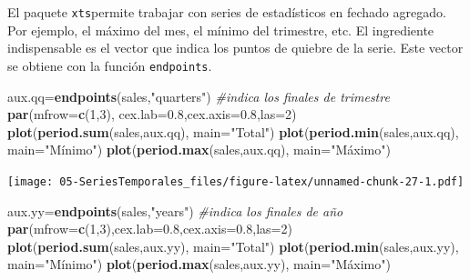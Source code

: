 \documentclass[]{book}
\newenvironment{Shaded}{\begin{snugshade}}{\end{snugshade}}
\newcommand{\CommentTok}[1]{\textcolor[rgb]{0.56,0.35,0.01}{\textit{#1}}}
\newcommand{\DataTypeTok}[1]{\textcolor[rgb]{0.13,0.29,0.53}{#1}}
\newcommand{\DecValTok}[1]{\textcolor[rgb]{0.00,0.00,0.81}{#1}}
\newcommand{\FloatTok}[1]{\textcolor[rgb]{0.00,0.00,0.81}{#1}}
\newcommand{\KeywordTok}[1]{\textcolor[rgb]{0.13,0.29,0.53}{\textbf{#1}}}
\newcommand{\NormalTok}[1]{#1}
\newcommand{\StringTok}[1]{\textcolor[rgb]{0.31,0.60,0.02}{#1}}
\begin{document}
El paquete \texttt{xts}permite trabajar con series de estadísticos en fechado agregado. Por ejemplo, el máximo del mes, el mínimo del trimestre, etc. El ingrediente indispensable es el vector que indica los puntos de quiebre de la serie. Este vector se obtiene con la función \texttt{endpoints}.

\begin{Shaded}
\begin{Highlighting}[]
\NormalTok{aux.qq=}\KeywordTok{endpoints}\NormalTok{(sales,}\StringTok{"quarters"}\NormalTok{) }\CommentTok{#indica los finales de trimestre}
\KeywordTok{par}\NormalTok{(}\DataTypeTok{mfrow=}\KeywordTok{c}\NormalTok{(}\DecValTok{1}\NormalTok{,}\DecValTok{3}\NormalTok{), }\DataTypeTok{cex.lab=}\FloatTok{0.8}\NormalTok{,}\DataTypeTok{cex.axis=}\FloatTok{0.8}\NormalTok{,}\DataTypeTok{las=}\DecValTok{2}\NormalTok{)}
\KeywordTok{plot}\NormalTok{(}\KeywordTok{period.sum}\NormalTok{(sales,aux.qq), }\DataTypeTok{main=}\StringTok{"Total"}\NormalTok{) }
\KeywordTok{plot}\NormalTok{(}\KeywordTok{period.min}\NormalTok{(sales,aux.qq), }\DataTypeTok{main=}\StringTok{"Mínimo"}\NormalTok{)}
\KeywordTok{plot}\NormalTok{(}\KeywordTok{period.max}\NormalTok{(sales,aux.qq), }\DataTypeTok{main=}\StringTok{"Máximo"}\NormalTok{)}
\end{Highlighting}
\end{Shaded}

\texttt{[image: 05-SeriesTemporales\_files/figure-latex/unnamed-chunk-27-1.pdf]}

\begin{Shaded}
\begin{Highlighting}[]
\NormalTok{aux.yy=}\KeywordTok{endpoints}\NormalTok{(sales,}\StringTok{"years"}\NormalTok{) }\CommentTok{#indica los finales de año}
\KeywordTok{par}\NormalTok{(}\DataTypeTok{mfrow=}\KeywordTok{c}\NormalTok{(}\DecValTok{1}\NormalTok{,}\DecValTok{3}\NormalTok{),}\DataTypeTok{cex.lab=}\FloatTok{0.8}\NormalTok{,}\DataTypeTok{cex.axis=}\FloatTok{0.8}\NormalTok{,}\DataTypeTok{las=}\DecValTok{2}\NormalTok{)}
\KeywordTok{plot}\NormalTok{(}\KeywordTok{period.sum}\NormalTok{(sales,aux.yy), }\DataTypeTok{main=}\StringTok{"Total"}\NormalTok{)}
\KeywordTok{plot}\NormalTok{(}\KeywordTok{period.min}\NormalTok{(sales,aux.yy), }\DataTypeTok{main=}\StringTok{"Mínimo"}\NormalTok{)}
\KeywordTok{plot}\NormalTok{(}\KeywordTok{period.max}\NormalTok{(sales,aux.yy), }\DataTypeTok{main=}\StringTok{"Máximo"}\NormalTok{)}
\end{Highlighting}
\end{Shaded}
\end{document}
